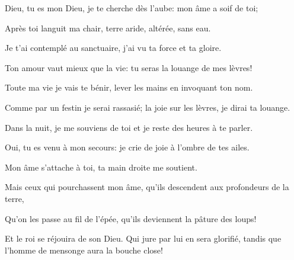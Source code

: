 \item Dieu, tu es mon Dieu,
   je te cherche dès l’aube: 
mon âme a soif de toi;

\item Après toi languit ma chair,
terre aride, altérée, sans eau.

\item Je t’ai contemplé au sanctuaire,
j’ai vu ta force et ta gloire.

\item Ton amour vaut mieux que la vie:
tu seras la louange de mes lèvres!

\item Toute ma vie je vais te bénir,
lever les mains en invoquant ton nom.

\item Comme par un festin je serai rassasié;
la joie sur les lèvres, je dirai ta louange.

\item Dans la nuit, je me souviens de toi
et je reste des heures à te parler.

\item Oui, tu es venu à mon secours:
je crie de joie à l’ombre de tes ailes.

\item Mon âme s’attache à toi,
ta main droite me soutient.

\item Mais ceux qui pourchassent mon âme, qu'ils descendent aux profondeurs de la terre,

\item Qu'on les passe au fil de l'épée, qu'ils deviennent la pâture des loups!

\item Et le roi se réjouira de son Dieu. Qui jure par lui en sera glorifié, tandis que l'homme de mensonge aura la bouche close!
